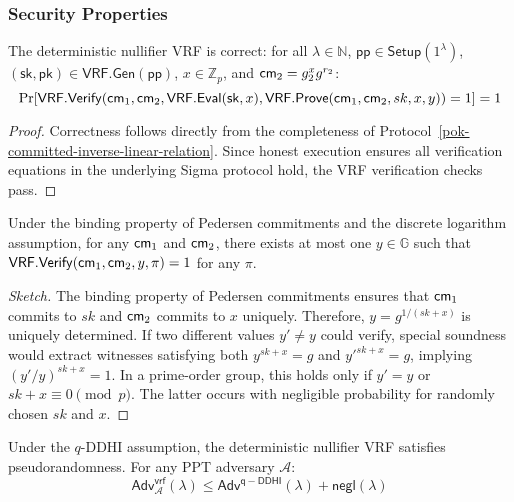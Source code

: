 \subsubsection{Security Properties}

\begin{theorem}[Correctness]
The deterministic nullifier VRF is correct: for all $\lambda \in \mathbb{N}$, $\mathsf{pp} \in \mathsf{Setup}(1^\lambda)$, $(\mathsf{sk}, \mathsf{pk}) \in \mathsf{VRF.Gen}(\mathsf{pp})$, $x \in \mathbb{Z}_p$, and $\mathsf{cm}_2 = g_2^{x} g^{r_2}$:
\[
\Pr[\mathsf{VRF.Verify}(\mathsf{cm}_1, \mathsf{cm}_2, \mathsf{VRF.Eval}(\mathsf{sk}, x), \mathsf{VRF.Prove}(\mathsf{cm}_1, \mathsf{cm}_2, sk, x, y)) = 1] = 1
\]
\end{theorem}

\begin{proof}
Correctness follows directly from the completeness of Protocol~\ref{pok-committed-inverse-linear-relation}. Since honest execution ensures all verification equations in the underlying Sigma protocol hold, the VRF verification checks pass.
\end{proof}

\begin{theorem}[Uniqueness]
Under the binding property of Pedersen commitments and the discrete logarithm assumption, for any $\mathsf{cm}_1$ and $\mathsf{cm}_2$, there exists at most one $y \in \mathbb{G}$ such that $\mathsf{VRF.Verify}(\mathsf{cm}_1, \mathsf{cm}_2, y, \pi) = 1$ for any $\pi$.
\end{theorem}

\begin{proof}[Sketch]
The binding property of Pedersen commitments ensures that $\mathsf{cm}_1$ commits to $sk$ and $\mathsf{cm}_2$ commits to $x$ uniquely. Therefore, $y = g^{1/(sk + x)}$ is uniquely determined. If two different values $y' \neq y$ could verify, special soundness would extract witnesses satisfying both $y^{sk+x} = g$ and $y'^{sk+x} = g$, implying $(y'/y)^{sk+x} = 1$. In a prime-order group, this holds only if $y' = y$ or $sk + x \equiv 0 \pmod{p}$. The latter occurs with negligible probability for randomly chosen $sk$ and $x$.
\end{proof}

\begin{theorem}[Pseudorandomness]
Under the $q$-DDHI assumption, the deterministic nullifier VRF satisfies pseudorandomness. For any PPT adversary $\mathcal{A}$:
\[
\mathsf{Adv}^{\mathsf{vrf}}_{\mathcal{A}}(\lambda) \leq \mathsf{Adv}^{\mathsf{q-DDHI}}(\lambda) + \mathsf{negl}(\lambda)
\]
\end{theorem}

